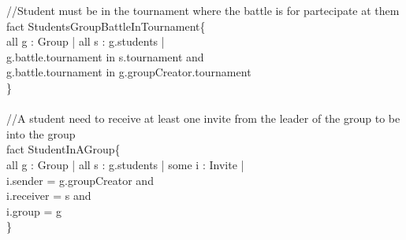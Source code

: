 \documentclass{article}
\begin{document}
{//Student must be in the tournament where the battle is for partecipate at them\\
\color{black}
\color{blue} fact \color{black} StudentsGroupBattleInTournament\{\\
\-\hspace{1cm} \color{blue} all \color{black} g : Group | \color{blue} all \color{black} s : g.students | \\
\-\hspace{1cm} g.battle.tournament \color{blue} in \color{black} s.tournament and \\
\-\hspace{1cm} g.battle.tournament \color{blue} in \color{black} g.groupCreator.tournament\\
\}\\
\\
\color{gray}
//A student need to receive at least one invite from the leader of the group to be into the group\\
\color{black}
\color{blue} fact \color{black} StudentInAGroup\{\\
\-\hspace{1cm} \color{blue} all \color{black} g : Group | \color{blue} all \color{black} s : g.students | \color{blue} some \color{black} i : Invite |\\
\-\hspace{1cm} i.sender \color{blue} = \color{black} g.groupCreator and\\
\-\hspace{1cm} i.receiver \color{blue} = \color{black} s  and \\
\-\hspace{1cm} i.group \color{blue} = \color{black} g\\
\}\\
}
\end{document}
